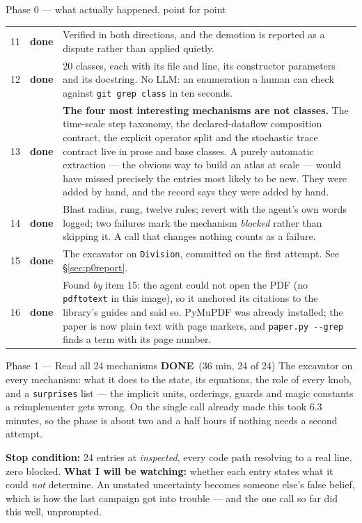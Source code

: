 \documentclass[11pt,a4paper]{article}
\newcommand{\code}[1]{\texttt{#1}}
\newcommand{\dn}{\textcolor{good}{\textbf{done}}}
\newcommand{\done}{\textcolor{good}{\textbf{DONE}}}
\begin{document}
\begin{phasebox}{Phase 0 --- what actually happened, point for point}
\begin{tabular}{@{}r@{.\ } l p{9.1cm}@{}}
11 & \dn & Verified in both directions, and the demotion is reported as a dispute rather than
applied quietly.\\
12 & \dn & 20 classes, each with its file and line, its constructor parameters and its docstring.
No LLM: an enumeration a human can check against \code{git grep class} in ten seconds.\\
13 & \dn & \textbf{The four most interesting mechanisms are not classes.} The time-scale step
taxonomy, the declared-dataflow composition contract, the explicit operator split and the
stochastic trace contract live in prose and base classes. A purely automatic extraction --- the
obvious way to build an atlas at scale --- would have missed precisely the entries most likely to
be new. They were added by hand, and the record says they were added by hand.\\
14 & \dn & Blast radius, rung, twelve rules; revert with the agent's own words logged; two
failures mark the mechanism \emph{blocked} rather than skipping it. A call that changes nothing
counts as a failure.\\
15 & \dn & The excavator on \code{Division}, committed on the first attempt. See \S\ref{sec:p0report}.\\
16 & \dn & Found \emph{by} item 15: the agent could not open the PDF (no \code{pdftotext} in this
image), so it anchored its citations to the library's guides and said so. PyMuPDF was already
installed; the paper is now plain text with page markers, and \code{paper.py -{}-grep} finds a
term with its page number.\\
\bottomrule
\end{tabular}
\end{phasebox}

\begin{phasebox}{Phase 1 --- Read all 24 mechanisms \hfill \done\ (36 min, 24 of 24)}
The excavator on every mechanism: what it does to the state, its equations, the role of every knob,
and a \code{surprises} list --- the implicit units, orderings, guards and magic constants a
reimplementer gets wrong. On the single call already made this took 6.3 minutes, so the phase is
about two and a half hours if nothing needs a second attempt.

\textbf{Stop condition:} 24 entries at \emph{inspected}, every code path resolving to a real line,
zero blocked. \textbf{What I will be watching:} whether each entry states what it could
\emph{not} determine. An unstated uncertainty becomes someone else's false belief, which is how
the last campaign got into trouble --- and the one call so far did this well, unprompted.
\end{phasebox}
\end{document}

